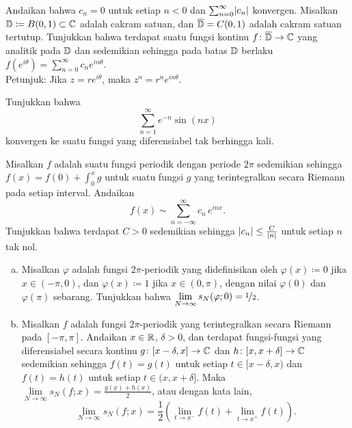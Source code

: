 \begin{exercise}
Andaikan bahwa $c_n = 0$ untuk setiap $n < 0$ dan $\sum_{n=0}^\infty \lvert {c_n} \rvert$
konvergen.  Misalkan ${\mathbb{D}} \coloneqq B(0,1) \subset {\mathbb{C}}$ adalah cakram satuan,
dan $\overline{{\mathbb{D}}} = C(0,1)$ adalah cakram satuan tertutup.
Tunjukkan bahwa terdapat suatu fungsi kontinu
$f \colon \overline{{\mathbb{D}}} \to {\mathbb{C}}$ yang analitik pada ${\mathbb{D}}$
dan sedemikian sehingga pada batas ${\mathbb{D}}$ berlaku
$f(e^{i\theta}) = \sum_{n=0}^\infty c_n e^{in\theta}$.\\
Petunjuk: Jika $z=re^{i\theta}$, maka $z^n = r^n e^{in\theta}$.
\end{exercise}

\begin{exercise}
Tunjukkan bahwa
\begin{equation*}
\sum_{n=1}^\infty e^{-n} \sin(n x)
\end{equation*}
konvergen ke suatu fungsi yang diferensiabel tak berhingga kali.
\end{exercise}

\begin{exercise} \label{exercise:fsdiffmindecay}
Misalkan $f$ adalah suatu fungsi periodik dengan periode $2\pi$
sedemikian sehingga $f(x) = f(0) + \int_0^x g$
untuk suatu fungsi $g$ yang terintegralkan secara Riemann pada setiap interval.
Andaikan
\begin{equation*}
f(x) \sim
\sum_{n=-\infty}^\infty c_n \,e^{inx} .
\end{equation*}
Tunjukkan bahwa terdapat $C > 0$ sedemikian sehingga
$\lvert {c_n} \rvert \leq \frac{C}{\lvert {n} \rvert}$ untuk setiap $n$ tak nol.
\end{exercise}

\begin{exercise}
\leavevmode
\begin{enumerate}[a)]
\item
Misalkan $\varphi$ adalah fungsi $2\pi$-periodik
yang didefinisikan oleh $\varphi(x) \coloneqq 0$ jika $x \in (-\pi,0)$,
dan $\varphi(x) \coloneqq 1$ jika $x \in (0,\pi)$,
dengan nilai $\varphi(0)$ dan $\varphi(\pi)$ sebarang. Tunjukkan
bahwa $\lim\limits_{N \to \infty} s_N(\varphi;0) = \nicefrac{1}{2}$.
\item
Misalkan $f$ adalah fungsi $2\pi$-periodik yang
terintegralkan secara Riemann pada $[-\pi,\pi]$.
Andaikan $x \in {\mathbb{R}}$, $\delta > 0$, dan terdapat fungsi-fungsi
yang diferensiabel secara kontinu
$g \colon [x-\delta,x] \to {\mathbb{C}}$
dan $h \colon [x,x+\delta] \to {\mathbb{C}}$
sedemikian sehingga $f(t) = g(t)$ untuk setiap $t \in [x-\delta,x)$
dan
$f(t) = h(t)$ untuk setiap $t \in (x,x+\delta]$.
Maka
$\lim\limits_{N\to\infty} s_N(f;x) = \frac{g(x)+h(x)}{2}$, atau dengan kata lain,
\begin{equation*}
\lim_{N \to \infty} s_N(f;x) =
\frac{1}{2}
\left(
\lim_{t \to x^-} f(t) +
\lim_{t \to x^+} f(t)
\right) .
\end{equation*}
\end{enumerate}
\end{exercise}

